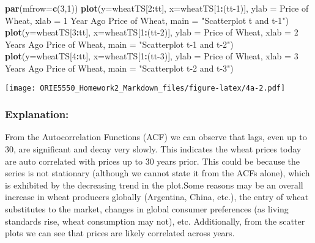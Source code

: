 \documentclass[
]{article}
\newenvironment{Shaded}{\begin{snugshade}}{\end{snugshade}}
\newcommand{\AttributeTok}[1]{\textcolor[rgb]{0.13,0.29,0.53}{#1}}
\newcommand{\DecValTok}[1]{\textcolor[rgb]{0.00,0.00,0.81}{#1}}
\newcommand{\FunctionTok}[1]{\textcolor[rgb]{0.13,0.29,0.53}{\textbf{#1}}}
\newcommand{\NormalTok}[1]{#1}
\newcommand{\SpecialCharTok}[1]{\textcolor[rgb]{0.81,0.36,0.00}{\textbf{#1}}}
\newcommand{\StringTok}[1]{\textcolor[rgb]{0.31,0.60,0.02}{#1}}
\begin{document}
\begin{Shaded}
\begin{Highlighting}[]
\FunctionTok{par}\NormalTok{(}\AttributeTok{mfrow=}\FunctionTok{c}\NormalTok{(}\DecValTok{3}\NormalTok{,}\DecValTok{1}\NormalTok{))}
\FunctionTok{plot}\NormalTok{(}\AttributeTok{y=}\NormalTok{wheatTS[}\DecValTok{2}\SpecialCharTok{:}\NormalTok{tt], }\AttributeTok{x=}\NormalTok{wheatTS[}\DecValTok{1}\SpecialCharTok{:}\NormalTok{(tt}\DecValTok{{-}1}\NormalTok{)], }\AttributeTok{ylab =} \StringTok{\textquotesingle{}Price of Wheat\textquotesingle{}}\NormalTok{, }\AttributeTok{xlab =} \StringTok{\textquotesingle{}1 Year Ago Price of Wheat\textquotesingle{}}\NormalTok{, }\AttributeTok{main =} \StringTok{"Scatterplot t and t{-}1"}\NormalTok{)}
\FunctionTok{plot}\NormalTok{(}\AttributeTok{y=}\NormalTok{wheatTS[}\DecValTok{3}\SpecialCharTok{:}\NormalTok{tt], }\AttributeTok{x=}\NormalTok{wheatTS[}\DecValTok{1}\SpecialCharTok{:}\NormalTok{(tt}\DecValTok{{-}2}\NormalTok{)], }\AttributeTok{ylab =} \StringTok{\textquotesingle{}Price of Wheat\textquotesingle{}}\NormalTok{, }\AttributeTok{xlab =} \StringTok{\textquotesingle{}2 Years Ago Price of Wheat\textquotesingle{}}\NormalTok{, }\AttributeTok{main =} \StringTok{"Scatterplot t{-}1 and t{-}2"}\NormalTok{)}
\FunctionTok{plot}\NormalTok{(}\AttributeTok{y=}\NormalTok{wheatTS[}\DecValTok{4}\SpecialCharTok{:}\NormalTok{tt], }\AttributeTok{x=}\NormalTok{wheatTS[}\DecValTok{1}\SpecialCharTok{:}\NormalTok{(tt}\DecValTok{{-}3}\NormalTok{)], }\AttributeTok{ylab =} \StringTok{\textquotesingle{}Price of Wheat\textquotesingle{}}\NormalTok{, }\AttributeTok{xlab =} \StringTok{\textquotesingle{}3 Years Ago Price of Wheat\textquotesingle{}}\NormalTok{, }\AttributeTok{main =} \StringTok{"Scatterplot t{-}2 and t{-}3"}\NormalTok{)}
\end{Highlighting}
\end{Shaded}

\texttt{[image: ORIE5550\_Homework2\_Markdown\_files/figure-latex/4a-2.pdf]}

\hypertarget{explanation}{%
\subsubsection{Explanation:}\label{explanation}}

From the Autocorrelation Functions (ACF) we can observe that lags, even
up to 30, are significant and decay very slowly. This indicates the
wheat prices today are auto correlated with prices up to 30 years prior.
This could be because the series is not stationary (although we cannot
state it from the ACFs alone), which is exhibited by the decreasing
trend in the plot.Some reasons may be an overall increase in wheat
producers globally (Argentina, China, etc.), the entry of wheat
substitutes to the market, changes in global consumer preferences (as
living standards rise, wheat consumption may not), etc. Additionally,
from the scatter plots we can see that prices are likely correlated
across years.
\end{document}
